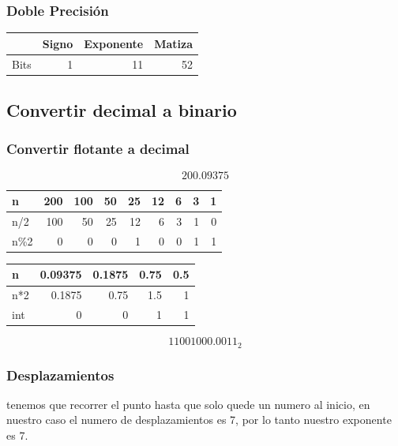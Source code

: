 \documentclass[11pt]{article}
\begin{document}
\subsubsection*{Doble Precisión}
\label{sec:orgd6789be}
\begin{center}
\begin{tabular}{|l|r|r|r|}
\hline
 & Signo & Exponente & Matiza\\
\hline
Bits & 1 & 11 & 52\\
\hline
\end{tabular}
\end{center}

\subsection{Convertir decimal a binario}
\label{sec:org9c0edf1}
\subsubsection*{Convertir flotante a decimal}
\label{sec:orgff3c4e2}
\[200.09375\]

\begin{center}
\begin{tabular}{|l|r|r|r|r|r|r|r|r|}
\hline
n & 200 & 100 & 50 & 25 & 12 & 6 & 3 & 1\\
\hline
n/2 & 100 & 50 & 25 & 12 & 6 & 3 & 1 & 0\\
n\%2 & 0 & 0 & 0 & 1 & 0 & 0 & 1 & 1\\
\hline
\end{tabular}
\end{center}

\begin{center}
\begin{tabular}{|l|r|r|r|r|}
\hline
n & 0.09375 & 0.1875 & 0.75 & 0.5\\
\hline
n*2 & 0.1875 & 0.75 & 1.5 & 1\\
int & 0 & 0 & 1 & 1\\
\hline
\end{tabular}
\end{center}

\[11001000.0011_2\]

\subsubsection*{Desplazamientos}
\label{sec:org707e1ea}
tenemos que recorrer el punto hasta que solo quede un numero al inicio, en nuestro caso el numero de desplazamientos es 7, por lo tanto nuestro exponente es 7.
\end{document}
